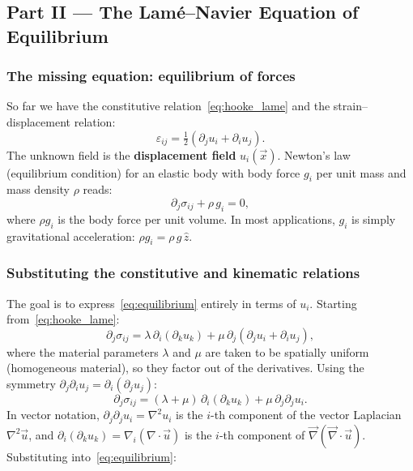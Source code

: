 \subsection*{Part II — The Lamé–Navier Equation of Equilibrium}

\subsubsection*{The missing equation: equilibrium of forces}

So far we have the constitutive relation~\eqref{eq:hooke_lame} and the strain–displacement relation:
\begin{equation}
    \varepsilon_{ij} = \tfrac{1}{2}\!\left(\partial_j u_i + \partial_i u_j\right).
    \label{eq:strain_disp_recap}
\end{equation}
The unknown field is the \textbf{displacement field} $u_i(\vec{x})$. Newton's law (equilibrium condition) for an elastic body with body force $g_i$ per unit mass and mass density $\rho$ reads:
\begin{equation}
    \partial_j \sigma_{ij} + \rho\, g_i = 0,
    \label{eq:equilibrium}
\end{equation}
where $\rho g_i$ is the body force per unit volume. In most applications, $g_i$ is simply gravitational acceleration: $\rho g_i = \rho\,g\,\hat{z}$.

\subsubsection*{Substituting the constitutive and kinematic relations}

The goal is to express~\eqref{eq:equilibrium} entirely in terms of $u_i$. Starting from~\eqref{eq:hooke_lame}:
\[
    \partial_j \sigma_{ij}
    = \lambda\,\partial_i(\partial_k u_k)
      + \mu\,\partial_j(\partial_j u_i + \partial_i u_j),
\]
where the material parameters $\lambda$ and $\mu$ are taken to be spatially uniform (homogeneous material), so they factor out of the derivatives. Using the symmetry $\partial_j \partial_i u_j = \partial_i(\partial_j u_j)$:
\[
    \partial_j \sigma_{ij}
    = (\lambda + \mu)\,\partial_i(\partial_k u_k)
      + \mu\,\partial_j\partial_j u_i.
\]
In vector notation, $\partial_j\partial_j u_i = \nabla^2 u_i$ is the $i$-th component of the vector Laplacian $\nabla^2\vec{u}$, and $\partial_i(\partial_k u_k) = \nabla_i(\nabla\cdot\vec{u})$ is the $i$-th component of $\vec{\nabla}(\vec{\nabla}\cdot\vec{u})$. Substituting into~\eqref{eq:equilibrium}:

